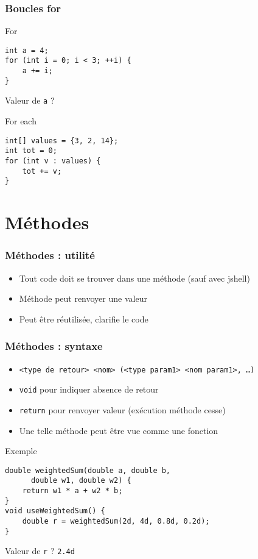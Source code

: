 \documentclass[english, french]{beamer}
\begin{document}
\begin{frame}[fragile]
	\frametitle{Boucles for}
	\begin{block}{For}
		\begin{lstlisting}
int a = 4;
for (int i = 0; i < 3; ++i) {
	a += i;
}
		\end{lstlisting}	
	\end{block}
	Valeur de \texttt{a} ? \onslide<2->{\texttt{7}}
	\begin{block}{For each}
		\begin{lstlisting}
int[] values = {3, 2, 14};
int tot = 0;
for (int v : values) {
	tot += v;
}
		\end{lstlisting}	
	\end{block}
\end{frame}

\section{Méthodes}
\begin{frame}[fragile]
	\frametitle{Méthodes : utilité}
	\begin{itemize}
		\item Tout code doit se trouver dans une méthode {\tiny (sauf avec jshell)}
		\item Méthode peut renvoyer une valeur
		\item Peut être réutilisée, clarifie le code
	\end{itemize}
\end{frame}

\begin{frame}[fragile]
	\frametitle{Méthodes : syntaxe}
	\begin{itemize}
		\item \texttt{<type de retour> <nom> (<type param1> <nom param1>, …)}
		\item \texttt{void} pour indiquer absence de retour
		\item \texttt{return} pour renvoyer valeur (exécution méthode cesse)
		\item Une telle méthode peut être vue comme une fonction
	\end{itemize}
	\begin{block}{Exemple}
		\begin{lstlisting}[tabsize=1]
double weightedSum(double a, double b, 
      double w1, double w2) {
	return w1 * a + w2 * b;
}
void useWeightedSum() {
	double r = weightedSum(2d, 4d, 0.8d, 0.2d);
}
		\end{lstlisting}	
	\end{block}
	Valeur de \texttt{r} ? \pause \texttt{2.4d}
\end{frame}
\end{document}

